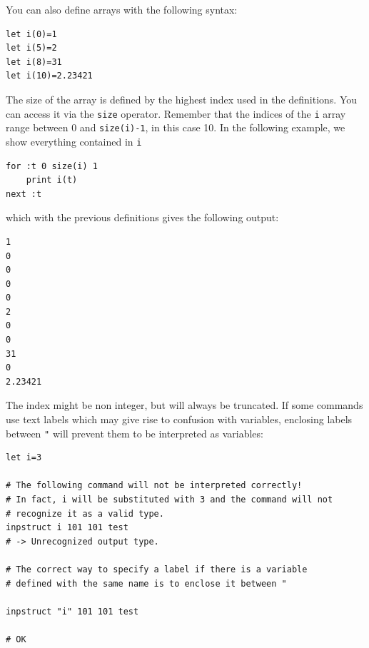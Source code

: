 You can also define arrays with the following syntax:
\begin{lstlisting}
let i(0)=1
let i(5)=2
let i(8)=31
let i(10)=2.23421
\end{lstlisting}
The size of the array is defined by the highest index used in the definitions.
You can access it via the \lstinline!size! operator. Remember that the indices of the \lstinline!i! array range between 0 and \lstinline!size(i)-1!, in this case 10. In the following example, we show everything contained in \lstinline!i!
\begin{lstlisting}
for :t 0 size(i) 1
    print i(t)
next :t
\end{lstlisting}
which with the previous definitions gives the following output:
\begin{lstlisting}
1 
0 
0 
0 
0 
2 
0 
0 
31 
0 
2.23421 
\end{lstlisting}
The index might be non integer, but will always be truncated.
If some commands use text labels which may give rise to confusion with variables, enclosing labels between \lstinline!"! will prevent them to be interpreted as variables:
 \begin{lstlisting}
let i=3

# The following command will not be interpreted correctly!
# In fact, i will be substituted with 3 and the command will not
# recognize it as a valid type.
inpstruct i 101 101 test
# -> Unrecognized output type.

# The correct way to specify a label if there is a variable
# defined with the same name is to enclose it between "

inpstruct "i" 101 101 test

# OK
\end{lstlisting}

